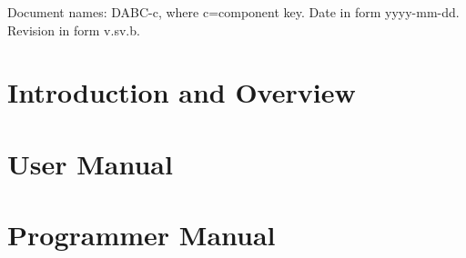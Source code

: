\documentclass{dabcclass}
\begin{document}
 \cleardoublepage
\thispagestyle{empty} \tableofcontents \thispagestyle{empty} \cleardoublepage
{}

 \cleardoublepage
 \cleardoublepage
 \cleardoublepage
 \cleardoublepage
 \cleardoublepage

\setcounter{chapter}{0}
Document names: DABC-c, where c=component key. Date in form yyyy-mm-dd.
Revision in form v.sv.b.\\

%



%
%

%
%
\cleardoublepage
\part{Introduction and Overview}
 \cleardoublepage
\part{User Manual}
 \cleardoublepage
\part{Programmer Manual}
 \cleardoublepage
\end{document}
